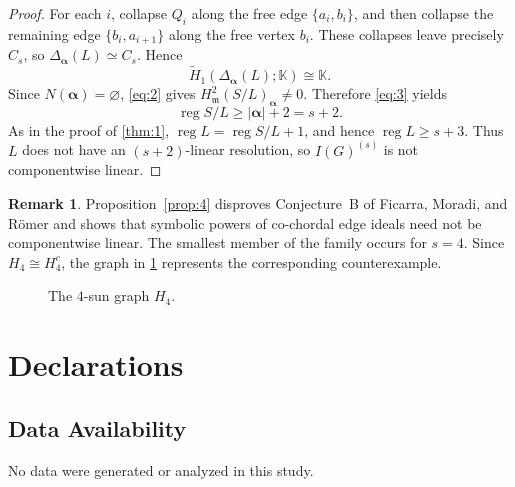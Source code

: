 \documentclass[11pt]{amsart}
\theoremstyle{definition}
\newtheorem{remark}[theorem]{Remark}
\newcommand{\reg}{\operatorname{reg}}
\newcommand{\m}{\mathfrak m}
\newcommand{\kk}{\mathbb K}
\begin{document}
\begin{proof}
For each $i$, collapse $Q_i$ along the free edge $\{a_i,b_i\}$, and then collapse the remaining edge $\{b_i,a_{i+1}\}$ along the free vertex $b_i$. These collapses leave precisely $C_s$, so $\Delta_{\boldsymbol{\alpha}}(L)\simeq C_s$. Hence
\[
\widetilde H_1(\Delta_{\boldsymbol{\alpha}}(L);\kk)\cong\kk.
\]
Since $N(\boldsymbol{\alpha})=\varnothing$, \cref{eq:2} gives $H^2_{\m}(S/L)_{\boldsymbol{\alpha}}\ne0$. Therefore \cref{eq:3} yields
\[
\reg S/L\ge|\boldsymbol{\alpha}|+2=s+2.
\]
As in the proof of \cref{thm:1}, $\reg L=\reg S/L+1$, and hence $\reg L\ge s+3$. Thus $L$ does not have an $(s+2)$-linear resolution, so $I(G)^{(s)}$ is not componentwise linear.
\end{proof}

\begin{remark}
Proposition~\ref{prop:4} disproves Conjecture~B of Ficarra, Moradi, and R\"omer \cite{FMR} and shows that symbolic powers of co-chordal edge ideals need not be componentwise linear. The smallest member of the family occurs for $s=4$. Since $H_4\cong H_4^c$, the graph in \cref{fig:4sun} represents the corresponding counterexample.

\begin{figure}[ht]
\centering
{}

\caption{The $4$-sun graph $H_4$.}
\label{fig:4sun}
\end{figure}
\end{remark}

\section*{Declarations}

\subsection*{Data Availability}
No data were generated or analyzed in this study.
\end{document}
